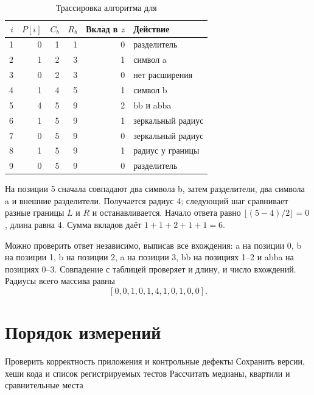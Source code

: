\begin{table}[H]\centering
\caption{Трассировка алгоритма для }
\begin{tabular}{rrrrrl}
\toprule
$i$ & $P[i]$ & $C_b$ & $R_b$ & Вклад в $z$ & Действие\\\midrule
1 & 0 & 1 & 1 & 0 & разделитель\\
2 & 1 & 2 & 3 & 1 & символ a\\
3 & 0 & 2 & 3 & 0 & нет расширения\\
4 & 1 & 4 & 5 & 1 & символ b\\
5 & 4 & 5 & 9 & 2 & bb и abba\\
6 & 1 & 5 & 9 & 1 & зеркальный радиус\\
7 & 0 & 5 & 9 & 0 & зеркальный радиус\\
8 & 1 & 5 & 9 & 1 & радиус у границы\\
9 & 0 & 5 & 9 & 0 & разделитель\\\bottomrule
\end{tabular}
\end{table}

На позиции 5 сначала совпадают два символа b, затем разделители, два символа a и внешние разделители. Получается радиус 4; следующий шаг сравнивает разные границы $L$ и $R$ и останавливается. Начало ответа равно $\lfloor(5-4)/2\rfloor=0$, длина равна 4. Сумма вкладов даёт $1+1+2+1+1=6$.

Можно проверить ответ независимо, выписав все вхождения: a на позиции 0, b на позиции 1, b на позиции 2, a на позиции 3, bb на позициях 1--2 и abba на позициях 0--3. Совпадение с таблицей проверяет и длину, и число вхождений. Радиусы всего массива равны
\[
 [0,0,1,0,1,4,1,0,1,0,0].
\]

\section{Порядок измерений}
\begin{algorithm}[H]
\small\DontPrintSemicolon
\caption{Сравнение полного набора тестов}
Проверить корректность приложения и контрольные дефекты\;
Сохранить версии, хеши кода и список регистрируемых тестов\;
Рассчитать медианы, квартили и сравнительные места\;
\end{algorithm}

